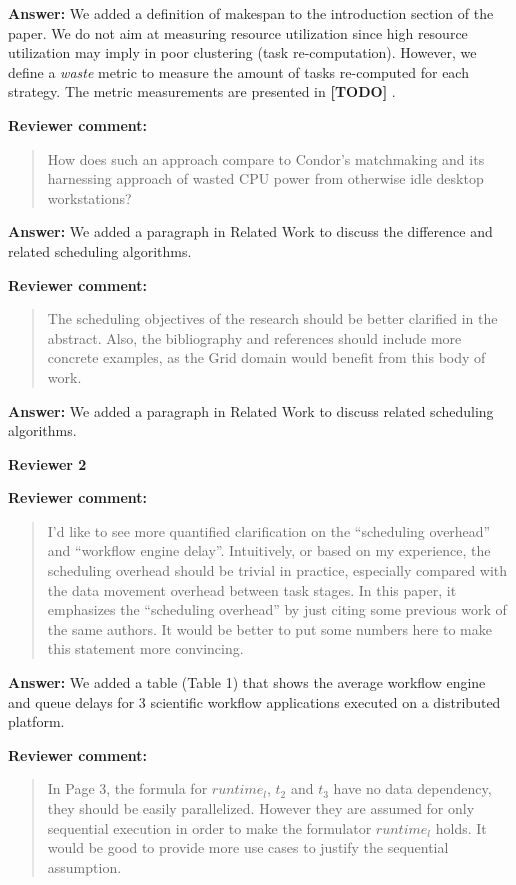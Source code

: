 \documentclass{letter}
\newenvironment{review}%
{\textbf{Reviewer comment:}\begin{quote}}%
{\end{quote}}%
\newcommand{\todo}[1]{%
      \color{red}\textbf{[TODO]} #1\color{black}}
\newcommand{\answer}[1]{%
      \textbf{Answer:} #1}
\begin{document}
\begin{letter}{}
\answer{We added a definition of makespan to the introduction section of the paper. We do not aim at measuring resource utilization since high resource utilization may imply in poor clustering (task re-computation). However, we define a \emph{waste} metric to measure the amount of tasks re-computed for each strategy. The metric measurements are presented in \todo{}.}



\begin{review}
How does such an approach compare to Condor's matchmaking and its harnessing approach of wasted CPU power from otherwise idle desktop workstations?
\end{review}

\answer{We added a paragraph in Related Work to discuss the difference and related scheduling algorithms.}



\begin{review}
The scheduling objectives of the research should be better clarified in the abstract. Also, the bibliography and references should include more concrete examples, as the Grid domain would benefit from this body of work. 
\end{review}

\answer{We added a paragraph in Related Work to discuss related scheduling algorithms.}



\newpage

%
%
\textbf{Reviewer 2}

\begin{review}
I'd like to see more quantified clarification on the ``scheduling overhead'' and ``workflow engine delay''. Intuitively, or based on my experience, the scheduling overhead should be trivial in practice, especially compared with the data movement overhead between task stages. In this paper, it emphasizes the ``scheduling overhead'' by just citing some previous work of the same authors. It would be better to put some numbers here to make this statement more convincing. 
\end{review}

\answer{We added a table (Table 1) that shows the average workflow engine and queue delays for 3 scientific workflow applications executed on a distributed platform.}



\begin{review}
In Page 3, the formula for $runtime_l$, $t_2$ and $t_3$ have no data dependency, they should be easily parallelized. However they are assumed for only sequential execution in order to make the formulator $runtime_l$ holds. It would be good to provide more use cases to justify the sequential assumption.
\end{review}


\end{letter}
\end{document}
